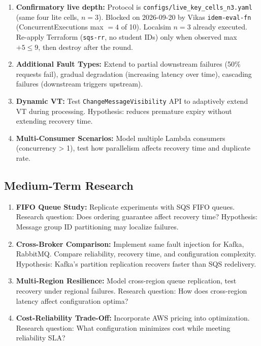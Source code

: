 \begin{enumerate}
    \item \textbf{Confirmatory live depth:} Protocol is \texttt{configs/live\_key\_cells\_n3.yaml} (same four lite cells, $n{=}3$). Blocked on 2026-09-20 by Vikas \texttt{idem-eval-fn} (ConcurrentExecutions max $=4$ of 10). Localsim $n{=}3$ already executed. Re-apply Terraform (\texttt{sqs-rr}, no student IDs) only when observed max $+5 \le 9$, then destroy after the round.
    
    \item \textbf{Additional Fault Types:} Extend to partial downstream failures (50\% requests fail), gradual degradation (increasing latency over time), cascading failures (downstream triggers upstream).
    
    \item \textbf{Dynamic VT:} Test \texttt{ChangeMessageVisibility} API to adaptively extend VT during processing. Hypothesis: reduces premature expiry without extending recovery time.
    
    \item \textbf{Multi-Consumer Scenarios:} Model multiple Lambda consumers (concurrency > 1), test how parallelism affects recovery time and duplicate rate.
\end{enumerate}

\subsection{Medium-Term Research}

\begin{enumerate}
    \item \textbf{FIFO Queue Study:} Replicate experiments with SQS FIFO queues. Research question: Does ordering guarantee affect recovery time? Hypothesis: Message group ID partitioning may localize failures.
    
    \item \textbf{Cross-Broker Comparison:} Implement same fault injection for Kafka, RabbitMQ. Compare reliability, recovery time, and configuration complexity. Hypothesis: Kafka's partition replication recovers faster than SQS redelivery.
    
    \item \textbf{Multi-Region Resilience:} Model cross-region queue replication, test recovery under regional failures. Research question: How does cross-region latency affect configuration optima?
    
    \item \textbf{Cost-Reliability Trade-Off:} Incorporate AWS pricing into optimization. Research question: What configuration minimizes cost while meeting reliability SLA?
\end{enumerate}

